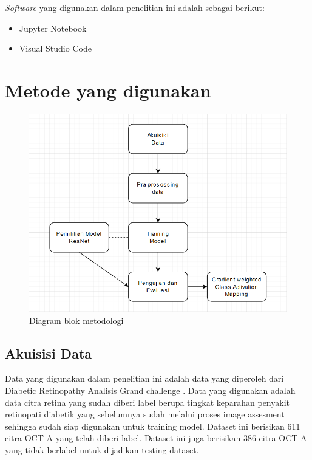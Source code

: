 \emph{Software} yang digunakan dalam penelitian ini adalah sebagai berikut:
\begin{itemize}
  \item Jupyter Notebook
  \item Visual Studio Code
\end{itemize}

\section{Metode yang digunakan}


\begin{figure} [H] \centering
  \includegraphics[scale=0.5]{gambar/diagramMethod.png}
  \caption{Diagram blok metodologi}
  \label{fig:diagramMethod}
\end{figure}

\subsection{Akuisisi Data}
Data yang digunakan dalam penelitian ini adalah data yang diperoleh dari Diabetic Retinopathy Analisis Grand challenge \parencite{drac_challenge_2023_10280359}. Data yang digunakan adalah data citra retina yang sudah diberi label berupa tingkat keparahan penyakit retinopati diabetik yang sebelumnya sudah melalui proses image assesment sehingga sudah siap digunakan untuk training model. Dataset ini berisikan 611 citra OCT-A yang telah diberi label. Dataset ini juga berisikan 386 citra OCT-A yang tidak berlabel untuk dijadikan testing dataset.

